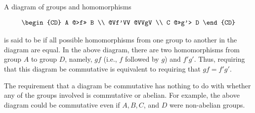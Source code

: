 A diagram of groups and homomorphisms

$$\begin{CD}
A @>f>> B \\
@Vf'VV @VVgV \\
C @>>g'> D
\end{CD}$$

is said to be  if all possible homomorphisms from one group to another in the diagram are equal. In the above diagram, there are two homomorphisms from group $A$ to group $D$, namely, $gf$ (i.e., $f$ followed by $g$) and $f'g'$. Thus, requiring that this diagram be commutative is equivalent to requiring that $gf = f'g'$.

 The requirement that a diagram be commutative has nothing to do with whether any of the groups involved is commutative or abelian. For example, the above diagram could be commutative even if $A, B, C$, and $D$ were non-abelian groups.
